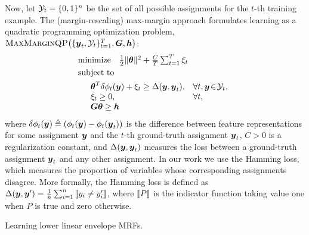 Now, let $\Y_t = \{0, 1\}^n$ be the set of all possible assignments
for the $t$-th training example. The (margin-rescaling) max-margin
approach formulates learning as a quadratic programming optimization
problem, $\mmqp{\Y_t}{\bG}{\bh}$:
%
\begin{align}
  & \textrm{minimize} \quad \textstyle \frac{1}{2} \|\btheta\|^2 + \frac{C}{T} \sum_{t=1}^{T} \xi_t
  \label{eqn:maxmarginqp} \\
  & \textrm{subject to} \notag \\
  & \begin{array}{lll}
    & \btheta^T \delta\phi_t(\by) + \xi_t \geq \Delta(\by, \by_t), & \forall t, \by \!\in\! \Y_t, \\
    & \xi_t \geq 0, & \forall t, \\
    & \bG \btheta \geq \bh
  \end{array} \notag
\end{align}
%
where $\delta\phi_t({\boldsymbol{y}}) \triangleq \left(\phi_t({\boldsymbol{y}}) -
\phi_t({\boldsymbol{y}}_t)\right)$ is the difference between feature
representations for some assignment ${\boldsymbol{y}}$ and the $t$-th ground-truth
assignment ${\boldsymbol{y}}_t$, $C > 0$ is a regularization constant, and
$\Delta({\boldsymbol{y}}, {\boldsymbol{y}}_t)$ measures the loss between a ground-truth
assignment ${\boldsymbol{y}}_t$ and any other assignment. In our work we use the
Hamming loss, which measures the proportion of variables whose
corresponding assignments disagree. More formally, the Hamming loss is
defined as $\Delta(\by, \by') = \frac{1}{n} \sum_{i=1}^{n} \ind{y_i
  \neq y'_i}$, where $\ind{P}$ is the indicator function taking value
one when $P$ is true and zero otherwise.

\begin{algorithm}[tb]
  \begin{algorithmic}[1]
    \REPEAT


    \ENDIF
    \ENDFOR
  \end{algorithmic}
  \caption{\label{alg:learning} Learning lower linear envelope MRFs.}
\end{algorithm}

